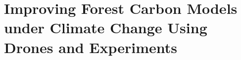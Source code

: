 \documentclass[12pt]{article}
\begin{document}
\pagestyle{fancy}
\fancyhf{} %
\fancyfoot[C]{\thepage}
\renewcommand{\headrulewidth}{0pt}




\section*{Improving Forest Carbon Models under Climate Change Using Drones and Experiments}
\end{document}
